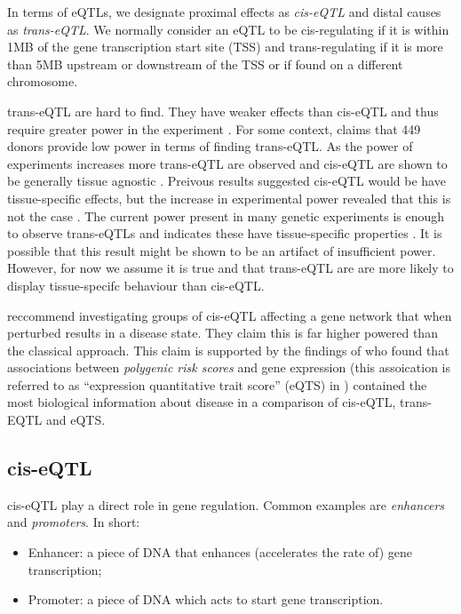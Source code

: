 \documentclass[a4paper,10pt]{article}
\begin{document}
In terms of eQTLs, we designate proximal effects as \emph{cis-eQTL} and distal causes as 
\emph{trans-eQTL}. We normally consider an eQTL to be cis-regulating if it is within 1MB of the 
gene transcription start site (TSS) and trans-regulating if it is more than 5MB upstream or 
downstream of the TSS or if found on a different chromosome.

trans-eQTL are hard to find. They have weaker effects than cis-eQTL and thus require greater power 
in the experiment \cite{dixon2007genome}. For some context, \citet{burgess2010principles} claims 
that 449 donors provide low power in terms of finding trans-eQTL. As the power of experiments increases 
more trans-eQTL are observed and cis-eQTL are shown to be generally tissue agnostic 
\cite{gtex2017genetic}. Preivous results suggested cis-eQTL would be have tissue-specific effects, 
but the increase in experimental power revealed that this is not the case \cite{grundberg2012mapping}. 
The current power present in many genetic experiments is enough to observe trans-eQTLs and indicates 
these have tissue-specific properties \cite{grundberg2012mapping} \cite{gtex2017genetic}. It is 
possible that this result might be shown to be an artifact of insufficient power. However, for now 
we assume it is true and that trans-eQTL are are more likely to display tissue-specifc behaviour 
than cis-eQTL.

\citet{nica2013expression} reccommend investigating groups of cis-eQTL affecting a gene network that 
when perturbed results in a disease state. They claim this is far higher powered than the classical 
approach. This claim is supported by the findings of \citet{vosa2018unraveling} who found that 
associations between \emph{polygenic risk scores} and gene expression (this assoication is referred 
to as ``expression quantitative trait score'' (eQTS) in \cite{vosa2018unraveling}) contained the 
most biological information about disease in a comparison of cis-eQTL, trans-EQTL and eQTS.

\subsection{cis-eQTL}
cis-eQTL play a direct role in gene regulation. Common examples are \emph{enhancers} and \emph{promoters}.
In short:
\begin{itemize}
 \item Enhancer: a piece of DNA that enhances (accelerates the rate of) gene transcription;
 \item Promoter: a piece of DNA which acts to start gene transcription.
\end{itemize}
\end{document}
